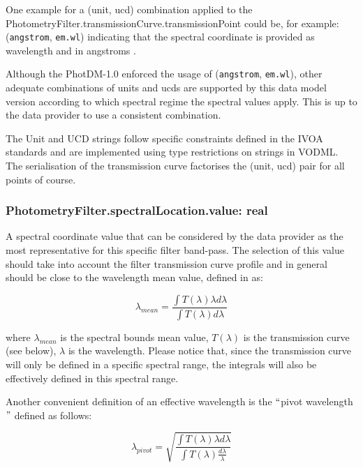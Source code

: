 \documentclass[11pt,a4paper]{ivoa}
\begin{document}
One example for a (unit, ucd) combination applied to the PhotometryFilter.transmissionCurve.transmissionPoint could be, for example:
(\texttt{angstrom}, \texttt{em.wl})
indicating that the spectral coordinate is provided as wavelength and in angstroms . 

\par

Although the PhotDM-1.0 enforced the usage of (\texttt{angstrom}, \texttt{em.wl}), other adequate combinations of units and ucds are supported by this data model version 
according to which spectral regime the spectral values apply. This is up to the data provider to use a consistent combination.

The Unit and UCD strings follow specific constraints defined in the IVOA standards and are
implemented using type restrictions on strings in VODML.
The  serialisation of the transmission curve factorises the (unit, ucd) pair for all points of course.
\par

\subsubsection{PhotometryFilter.spectralLocation.value: real}
A spectral coordinate value that can be considered by the data provider as the
most representative for this specific filter band-pass. The selection of this
value should take into account the filter transmission curve profile and in
general should be close to the wavelength mean value, defined
in \citet{1982AJ.....87..670O} as:
\par
\begin{equation} \label{eq:16}
\lambda_{mean} = \frac{\int T(\lambda)\lambda d\lambda}{\int T(\lambda)d\lambda}
\end{equation}

where $\lambda_{mean}$ is the spectral bounds mean value, $T(\lambda)$ is
the transmission curve (see below), $\lambda$ is the wavelength. Please
notice that, since the transmission curve will only be defined in a specific
spectral range, the integrals will also be effectively defined in this
spectral range.
\par

Another convenient definition of an effective wavelength is the
$``$pivot wavelength$"$  defined as follows:

\begin{equation} \label{eq:17}
\lambda_{pivot} = \sqrt{\frac{\int T(\lambda)\lambda d\lambda}{\int T(\lambda)\frac{d\lambda}{\lambda}}}
\end{equation}
\end{document}
